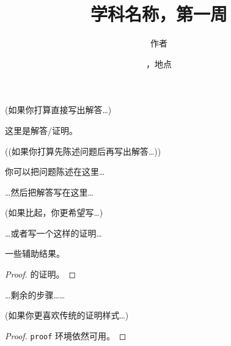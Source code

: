 \documentclass[11pt,
  logo = {example-image},
  title in boldface,
  theorem in new line,
]{homework}
\title{学科名称，第一周}
\author{作者}
\date{\TheDate{2023-12-25}，地点}
\begin{document}
\bigskip\textcolor{gray!55}{(如果你打算直接写出解答…)}

\begin{problem}
    这里是解答/证明。
\end{problem}


\bigskip\textcolor{gray!55}{((如果你打算先陈述问题后再写出解答…))}

\begin{problem}
    你可以把问题陈述在这里…
\end{problem}

\begin{solution}
    …然后把解答写在这里…
\end{solution}

\bigskip\textcolor{gray!55}{(如果比起，你更希望写…)}

\begin{solution}[证明]
    …或者写一个这样的证明…
    \begin{lemma}\label{lem}
        一些辅助结果。
    \end{lemma}
    \begin{proof}
        的证明。
    \end{proof}
    …剩余的步骤……
\end{solution}


\bigskip\textcolor{gray!55}{(如果你更喜欢传统的证明样式…)}

\begin{proof}
    \verb|proof| 环境依然可用。
\end{proof}
\end{document}
